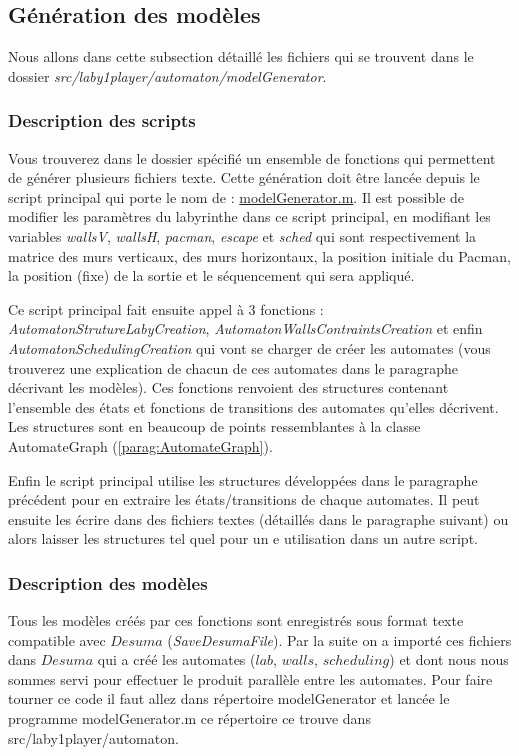 \subsection{Génération des modèles} \label{subsec:generationModele}
\begin{center}
Nous allons dans cette subsection détaillé les fichiers qui se trouvent dans le dossier \emph{src/laby1player/automaton/modelGenerator}.
\end{center}
\subsubsection{Description des scripts} %
Vous trouverez dans le dossier spécifié un ensemble de fonctions qui permettent de générer plusieurs fichiers texte. Cette génération doit être lancée depuis le script principal qui porte le nom de : \underline{modelGenerator.m}. Il est possible de modifier les paramètres du labyrinthe dans ce script principal, en modifiant les variables \emph{wallsV}, \emph{wallsH}, \emph{pacman}, \emph{escape} et \emph{sched} qui sont respectivement la matrice des murs verticaux, des murs horizontaux, la position initiale du Pacman, la position (fixe) de la sortie et le séquencement qui sera appliqué.

Ce script principal fait ensuite appel à 3 fonctions : \emph{AutomatonStrutureLabyCreation}, \emph{AutomatonWallsContraintsCreation} et enfin \emph{AutomatonSchedulingCreation} qui vont se charger de créer les automates (vous trouverez une explication de chacun de ces automates dans le paragraphe décrivant les modèles). Ces fonctions renvoient des structures contenant l'ensemble des états et fonctions de transitions des automates qu'elles décrivent. Les structures sont en beaucoup de points ressemblantes à la classe AutomateGraph (\ref{parag:AutomateGraph}).


Enfin le script principal utilise les structures développées dans le paragraphe précédent pour en extraire les états/transitions de chaque automates. Il peut ensuite les écrire dans des fichiers textes (détaillés dans le paragraphe suivant) ou alors laisser les structures tel quel pour un e utilisation dans un autre script.


\subsubsection{Description des modèles}\label{sub:descriptionDesModeles}
Tous les modèles créés par ces fonctions sont enregistrés sous format texte compatible avec $Desuma$ (\emph{SaveDesumaFile}). Par la suite on a importé ces fichiers dans $Desuma$ qui a créé les automates ($lab$, $walls$, $scheduling$) et dont nous nous sommes servi pour effectuer le produit parallèle entre les automates. Pour faire tourner ce code il faut allez dans répertoire modelGenerator et lancée le programme modelGenerator.m ce répertoire ce trouve dans src/laby1player/automaton.

